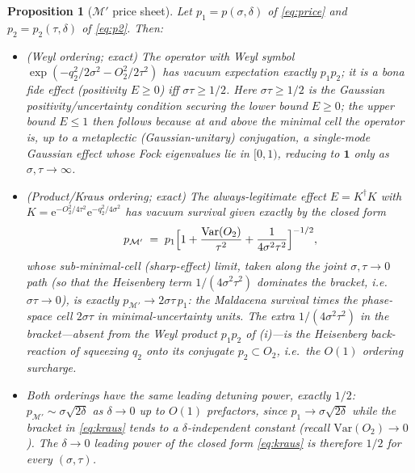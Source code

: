 \documentclass[11pt]{article}
\newtheorem{proposition}[theorem]{Proposition}
\theoremstyle{definition}
\theoremstyle{remark}
\newcommand{\ee}{\mathrm{e}}
\begin{document}
\begin{proposition}[$\mathcal{M}'$ price sheet]
\label{prop:mprime}
Let $p_{1}=p(\sigma,\delta)$ of \eqref{eq:price} and
$p_{2}=p_{2}(\tau,\delta)$ of \eqref{eq:p2}. Then:
\begin{itemize}
\item[(i)] (Weyl ordering; exact) The operator with Weyl symbol
$\exp(-q_{2}^{2}/2\sigma^{2}-O_{2}^{2}/2\tau^{2})$ has vacuum
expectation exactly $p_{1}p_{2}$; it is a bona fide effect
(positivity $E\ge0$) iff $\sigma\tau\ge1/2$. Here $\sigma\tau\ge1/2$ is the
Gaussian positivity/uncertainty condition securing the lower bound
$E\ge0$; the upper bound $E\le1$ then follows because at and above
the minimal cell the operator is, up to a metaplectic
(Gaussian-unitary) conjugation, a single-mode Gaussian effect whose
Fock eigenvalues lie in $[0,1)$, reducing to $\mathbf{1}$ only as
$\sigma,\tau\to\infty$.
\item[(ii)] (Product/Kraus ordering; exact) The always-legitimate
effect $E=K^{\dagger}K$ with
$K=\ee^{-O_{2}^{2}/4\tau^{2}}\allowbreak\ee^{-q_{2}^{2}/4\sigma^{2}}$ has vacuum
survival given exactly by the closed form
\begin{equation}
p_{\mathcal{M}'}\;=\;p_{1}\Bigl[1+\frac{\mathrm{Var}(O_{2})}{\tau^{2}}
+\frac{1}{4\sigma^{2}\tau^{2}}\Bigr]^{-1/2},
\label{eq:kraus}
\end{equation}
whose sub-minimal-cell (sharp-effect) limit, taken along the joint
$\sigma,\tau\to0$ path (so that the Heisenberg term
$1/(4\sigma^{2}\tau^{2})$ dominates the bracket, i.e.\
$\sigma\tau\to0$), is exactly
$p_{\mathcal{M}'}\to2\sigma\tau\,p_{1}$: the Maldacena survival times the
phase-space cell $2\sigma\tau$ in minimal-uncertainty units. The
extra $1/(4\sigma^{2}\tau^{2})$ in the bracket---absent from the Weyl
product $p_{1}p_{2}$ of (i)---is the Heisenberg back-reaction of
squeezing $q_{2}$ onto its conjugate $p_{2}\subset O_{2}$, i.e.\ the
$O(1)$ ordering surcharge.
\item[(iii)] Both orderings have the same leading detuning power,
exactly $1/2$: $p_{\mathcal{M}'}\sim\sigma\sqrt{2\delta}$ as $\delta\to0$ up to
$O(1)$ prefactors, since $p_{1}\to\sigma\sqrt{2\delta}$ while the
bracket in \eqref{eq:kraus} tends to a $\delta$-independent constant
(recall $\mathrm{Var}(O_{2})\to0$). The $\delta\to0$ leading power of
the closed form \eqref{eq:kraus} is therefore $1/2$ for every
$(\sigma,\tau)$.
\end{itemize}
\end{proposition}
\end{document}
